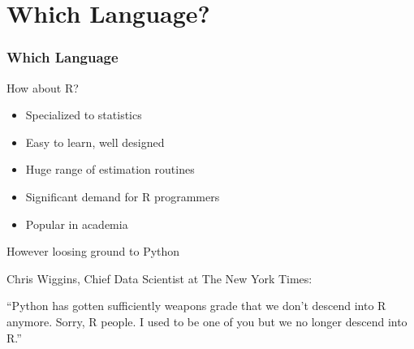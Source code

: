 \section{Which Language?}


\begin{frame}
    \frametitle{Which Language}


    How about R?
    \vspace{0.5em}

    \begin{itemize}
        \item Specialized to statistics
            \vspace{0.5em}
        \item Easy to learn, well designed
            \vspace{0.5em}
        \item Huge range of estimation routines
            \vspace{0.5em}
        \item Significant demand for R programmers
            \vspace{0.5em}
        \item Popular in academia 
    \end{itemize}

\end{frame}


\begin{frame}
    
    However loosing ground to Python
            \vspace{0.5em}
            \vspace{0.5em}
            \vspace{0.5em}

    \Eg Chris Wiggins, Chief Data Scientist at The New York Times:

            \vspace{0.5em}
     ``Python has gotten sufficiently weapons grade that we don't descend into
     R anymore. Sorry, R people. I used to be one of you but we no longer
     descend into R.''


\end{frame}


